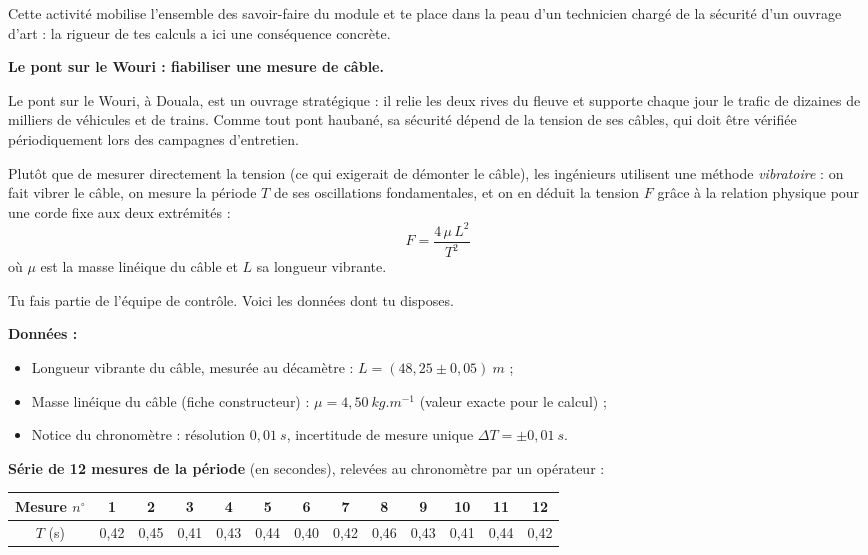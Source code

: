 \documentclass[11pt]{article}
\newcommand{\cle}[1]{{\popxbold\color{popdark}#1}}
\newcounter{popsec}
\newcounter{popsub}
\newcommand{\courssub}[1]{%
  \stepcounter{popsub}%
  \par\vspace{9pt}\noindent{\popxbold\fontsize{11.5}{13}\selectfont\color{popink}{\color{poporange}\thepopsec.\thepopsub}\hspace{6pt}#1}\par\nopagebreak\vspace{4pt}
}
\begin{document}
Cette activité mobilise l'ensemble des savoir-faire du module et te place dans la peau d'un technicien chargé de la sécurité d'un ouvrage d'art : la rigueur de tes calculs a ici une conséquence concrète.

\courssub{Situation}

\textbf{Le pont sur le Wouri : fiabiliser une mesure de câble.}

Le pont sur le Wouri, à Douala, est un ouvrage stratégique : il relie les deux rives du fleuve et supporte chaque jour le trafic de dizaines de milliers de véhicules et de trains. Comme tout pont haubané, sa sécurité dépend de la \cle{tension} de ses câbles, qui doit être vérifiée périodiquement lors des campagnes d'entretien.

Plutôt que de mesurer directement la tension (ce qui exigerait de démonter le câble), les ingénieurs utilisent une méthode \emph{vibratoire} : on fait vibrer le câble, on mesure la \cle{période} $T$ de ses oscillations fondamentales, et on en déduit la tension $F$ grâce à la relation physique pour une corde fixe aux deux extrémités :
\[ F = \dfrac{4\,\mu\,L^{2}}{T^{2}} \]
où $\mu$ est la masse linéique du câble et $L$ sa longueur vibrante.

Tu fais partie de l'équipe de contrôle. Voici les données dont tu disposes.

\textbf{Données :}
\begin{itemize}
\item Longueur vibrante du câble, mesurée au décamètre : $L = (48{,}25 \pm 0{,}05)\ \si{m}$ ;
\item Masse linéique du câble (fiche constructeur) : $\mu = 4{,}50\ \si{kg.m^{-1}}$ (valeur exacte pour le calcul) ;
\item Notice du chronomètre : résolution $0{,}01\ \si{s}$, incertitude de mesure unique $\Delta T = \pm 0{,}01\ \si{s}$.
\end{itemize}

\textbf{Série de 12 mesures de la période} (en secondes), relevées au chronomètre par un opérateur :

\begin{center}
\begin{tabular}{|c|cccccccccccc|}\hline
\rowcolor{popblueL} Mesure $n^{\circ}$ & 1 & 2 & 3 & 4 & 5 & 6 & 7 & 8 & 9 & 10 & 11 & 12 \\ \hline
$T$ (s) & 0,42 & 0,45 & 0,41 & 0,43 & 0,44 & 0,40 & 0,42 & 0,46 & 0,43 & 0,41 & 0,44 & 0,42 \\ \hline
\end{tabular}
\end{center}
\end{document}
